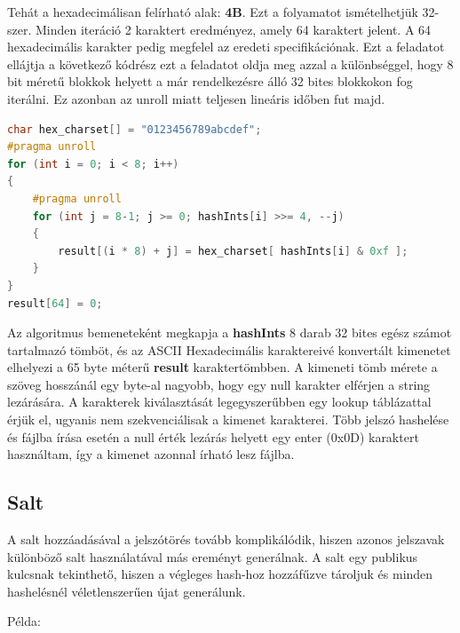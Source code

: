 Tehát a hexadecimálisan felírható alak: \textbf{4B}. Ezt a folyamatot ismételhetjük 32-szer. Minden iteráció 2 karaktert eredményez, amely 64 karaktert jelent. A 64 hexadecimális karakter pedig megfelel az eredeti specifikációnak. Ezt a feladatot ellájtja a következő kódrész ezt a feladatot oldja meg azzal a különbséggel, hogy 8 bit méretű blokkok helyett a már rendelkezésre álló 32 bites blokkokon fog iterálni. Ez azonban az unroll miatt teljesen lineáris időben fut majd.


\begin{lstlisting}[language={C++}]
char hex_charset[] = "0123456789abcdef";
#pragma unroll
for (int i = 0; i < 8; i++)
{
    #pragma unroll
    for (int j = 8-1; j >= 0; hashInts[i] >>= 4, --j)
    {
        result[(i * 8) + j] = hex_charset[ hashInts[i] & 0xf ];
    }
}
result[64] = 0;
\end{lstlisting}


Az algoritmus bemeneteként megkapja a \textbf{hashInts} 8 darab 32 bites egész számot tartalmazó tömböt, és az ASCII Hexadecimális karaktereivé konvertált kimenetet elhelyezi a 65 byte méterű \textbf{result} karaktertömbben. A kimeneti tömb mérete a szöveg hosszánál egy byte-al nagyobb, hogy egy null karakter elférjen a string lezárására. A karakterek kiválasztását legegyszerűbben egy lookup táblázattal érjük el, ugyanis nem szekvenciálisak a kimenet karakterei. Több jelszó hashelése és fájlba írása esetén a null érték lezárás helyett egy enter (0x0D) karaktert használtam, így a kimenet azonnal írható lesz fájlba.


\subsection{Salt}

A salt hozzáadásával a jelszótörés tovább komplikálódik, hiszen azonos jelszavak különböző salt használatával más ereményt generálnak. A salt egy publikus kulcsnak tekinthető, hiszen a végleges hash-hoz hozzáfűzve tároljuk és minden hashelésnél véletlenszerűen újat generálunk.

Példa:

